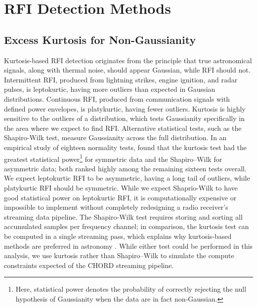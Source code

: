 \section{RFI Detection Methods}
\label{sec:rfi_detection_methods}
\subsection{Excess Kurtosis for Non-Gaussianity}

Kurtosis-based RFI detection originates from the principle that true astronomical signals, along with thermal noise, should appear Gaussian, while RFI should not. Intermittent RFI, produced from lightning strikes, engine ignition, and radar pulses, is leptokurtic, having more outliers than expected in Gaussian distributions. Continuous RFI, produced from communication signals with defined power envelopes, is platykurtic, having fewer outliers. Kurtosis is highly sensitive to the outliers of a distribution, which tests Gaussianity specifically in the area where we expect to find RFI. Alternative statistical tests, such as the Shapiro-Wilk test, measure Gaussianity across the full distribution. In an empirical study of eighteen normality tests, \citet{joPerformancesSeveralUnivariate2016} found that the kurtosis test had the greatest statistical power\footnote{Here, statistical power denotes the probability of correctly rejecting the null hypothesis of Gaussianity when the data are in fact non-Gaussian.} for symmetric data and the Shapiro–Wilk for asymmetric data; both ranked highly among the remaining sixteen tests overall. We expect leptokurtic RFI to be asymmetric, having a long tail of outliers, while platykurtic RFI should be symmetric. While we expect Shaprio-Wilk to have good statistical power on leptokurtic RFI, it is computationally expensive or impossible to implement without completely redesigning a radio receiver's streaming data pipeline. The Shapiro-Wilk test requires storing and sorting all accumulated samples per frequency channel; in comparison, the kurtosis test can be computed in a single streaming pass, which explains why kurtosis-based methods are preferred in astronomy \cite{taylorSpectralKurtosisBasedRFI2019}. While either test could be performed in this analysis, we use kurtosis rather than Shapiro–Wilk to simulate the compute constraints expected of the CHORD streaming pipeline.\\

